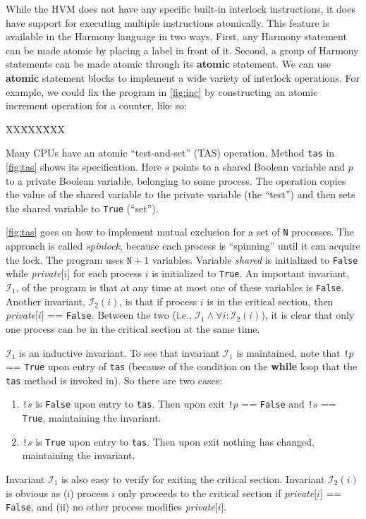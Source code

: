 \documentclass{report}
\newcommand{\harmonysource}[1]{
\begin{tabbing}
XX\=XXX\=XXX\kill
    
\end{tabbing}
}
\newenvironment{code}{
\tcolorbox
}{
\endtcolorbox
}
\begin{document}
While the HVM does not have any specific built-in interlock instructions,
it does have support for executing multiple instructions atomically.
This feature is available in the Harmony language in two ways.
First, any Harmony statement can be made atomic by placing a label in front
of it.  Second, a group of Harmony statements can be made atomic
through its \textbf{atomic}
%
statement.
We can use \textbf{atomic} statement blocks to implement a wide variety of
interlock operations.
For example, we could fix the program in \autoref{fig:inc} by
constructing an atomic increment operation for a counter, like so:
\begin{code}
\harmonysource{atomicinc}
\end{code}

Many CPUs have an atomic ``test-and-set'' (TAS)
%
%
operation.
Method \texttt{tas} in \autoref{fig:tas} shows its specification.
Here $s$ points to a shared Boolean variable and $p$
to a private Boolean variable, belonging to some process.
The operation copies the value of the shared variable to the
private variable (the ``test'')
and then sets the shared variable to \texttt{True} (``set'').

\autoref{fig:tas} goes on how to implement mutual exclusion for
a set of \texttt{N} processes.
The approach is called \emph{spinlock},
%
because each process is ``spinning'' until
it can acquire the lock.
The program uses $\mathtt{N}+1$ variables.
Variable \textit{shared} is initialized to \texttt{False} while
\textit{private}[$i$] for each process $i$ is initialized to \texttt{True}.
An important invariant, $\mathcal{I}_1$, of the program is that at any time at most
one of these variables is \texttt{False}.
Another invariant, $\mathcal{I}_2(i)$, is that if process $i$ is in the critical section,
then \textit{private}[$i$] == \texttt{False}.
Between the two (i.e., $\mathcal{I}_1 \land \forall i: \mathcal{I}_2(i)$),
it is clear that only one process can be in the
critical section at the same time.

$\mathcal{I}_1$ is an inductive invariant.
To see that invariant $\mathcal{I}_1$ is maintained, note that
\texttt{!{}}$p$ == \texttt{True} upon entry of \texttt{tas}
(because of the condition on the \textbf{while} loop that the
\texttt{tas} method is invoked in).
So there are two cases:
\begin{enumerate}
\item \texttt{!{}}$s$ is \texttt{False} upon entry to \texttt{tas}.
Then upon exit \texttt{!{}}$p$ == \texttt{False} and \texttt{!{}}$s$ == \texttt{True},
maintaining the invariant.
\item \texttt{!{}}$s$ is \texttt{True} upon entry to \texttt{tas}.
Then upon exit nothing has changed, maintaining the invariant.
\end{enumerate}
Invariant $\mathcal{I}_1$ is also easy to verify for exiting the critical section.
Invariant $\mathcal{I}_2(i)$ is obvious as (i) process $i$ only proceeds to the critical
section if \textit{private}[$i$] == \texttt{False}, and (ii) no other process modifies
\textit{private}[$i$].
\end{document}
